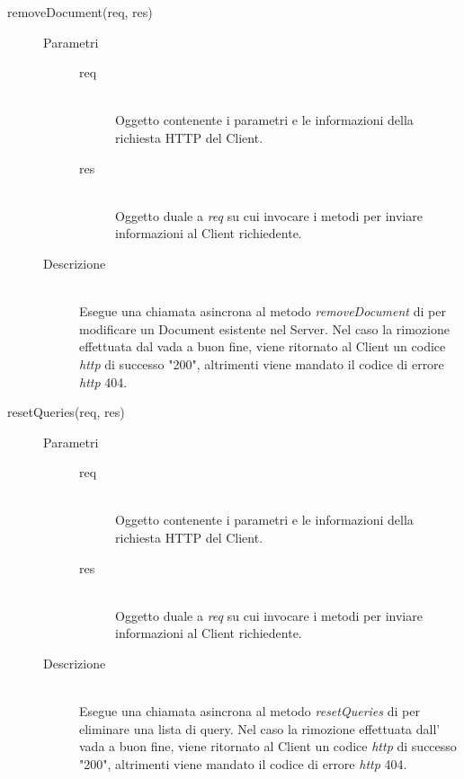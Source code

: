 \begin{description}
\begin{description}
 \item[removeDocument(req, res)] \hfill 
 \begin{description}
 \item[Parametri] \hfill
  \begin{description}
   \item[req] \hfill \\
   Oggetto contenente i parametri e le informazioni della richiesta HTTP del Client.
   \item[res] \hfill \\
   Oggetto duale a \textit{req} su cui invocare i metodi per inviare informazioni al Client richiedente.
  \end{description}
 \item[Descrizione] \hfill \\
 Esegue una chiamata asincrona al metodo \textit{removeDocument} di  per modificare un Document esistente nel Server. Nel caso la rimozione effettuata dal  vada a buon fine, viene ritornato al Client un codice \textit{http} di successo "200", altrimenti viene mandato il codice di errore \textit{http} 404.
 \end{description}
\item[resetQueries(req, res)] \hfill 
  \begin{description}
  \item[Parametri] \hfill
   \begin{description}
    \item[req] \hfill \\
    Oggetto contenente i parametri e le informazioni della richiesta HTTP del Client.
    \item[res] \hfill \\
    Oggetto duale a \textit{req} su cui invocare i metodi per inviare informazioni al Client richiedente.
   \end{description}
  \item[Descrizione] \hfill \\
  Esegue una chiamata asincrona al metodo \textit{resetQueries} di  per eliminare una lista di query. Nel caso la rimozione effettuata dall'  vada a buon fine, viene ritornato al Client un codice \textit{http} di successo "200", altrimenti viene mandato il codice di errore \textit{http} 404.
  \end{description}
 

\end{description}
\end{description}
